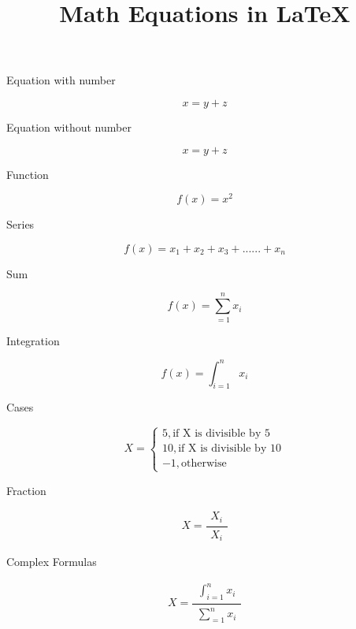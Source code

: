 \documentclass{article}
\begin{document}
\title{Math Equations in {\LaTeX}}
\maketitle

Equation with number

\begin{equation}
x = y + z
\end{equation}

Equation without number

\begin{equation*}
x = y + z
\end{equation*}

Function

\begin{equation}
f(x) = x ^ 2
\end{equation}

Series

\begin{equation}
f(x) = x_1 + x_2 + x_3 + ...... + x_n
\end{equation}

Sum

\begin{equation}
f(x) = \sum_{=1}^{n}{x_i}
\end{equation}

Integration

\begin{equation}
f(x) = \int_{i=1}^{n}{x_i}
\end{equation}

Cases

\begin{equation}
X=
\begin{cases}
5, \text{if X is divisible by 5}
\\
10, \text{if X is divisible by 10}
\\
-1, \text{otherwise}
\end{cases}
\end{equation}

Fraction

\begin{equation}
X =
\frac{\substack{X_i}}
{\substack{X_i}}
\end{equation}

Complex Formulas

\begin{equation}
X =
\frac{\substack{\int_{i=1}^{n}{x_i}}}
{\substack{\sum_{=1}^{n}{x_i}}}
\end{equation}
\end{document}
